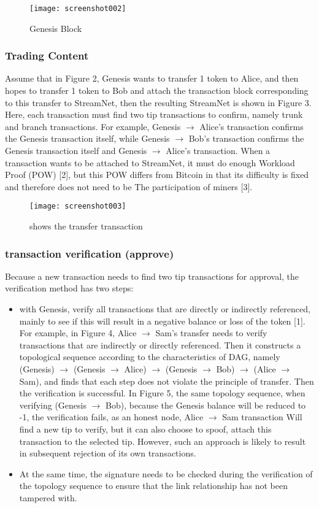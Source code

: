 \documentclass{article}
\begin{document}
\begin{figure}[H]
	\centering
	\texttt{[image: screenshot002]}
	\caption{Genesis Block}
	\label{simulationfigure}
\end{figure}

\subsubsection{Trading Content}
Assume that in Figure 2, Genesis wants to transfer 1 token to Alice, and then hopes to transfer 1 token to Bob and attach the transaction block corresponding to this transfer to StreamNet, then the resulting StreamNet is shown in Figure 3. Here, each transaction must find two tip transactions to confirm, namely trunk and branch transactions. For example, Genesis $\rightarrow$ Alice's transaction confirms the Genesis transaction itself, while Genesis $\rightarrow$ Bob's transaction confirms the Genesis transaction itself and Genesis $\rightarrow$ Alice's transaction. When a transaction wants to be attached to StreamNet, it must do enough Workload Proof (POW) [2], but this POW differs from Bitcoin in that its difficulty is fixed and therefore does not need to be The participation of miners [3].

\begin{figure}[H]
	\centering
	\texttt{[image: screenshot003]}
	\caption{shows the transfer transaction}
	\label{simulationfigure}
\end{figure}

\subsubsection{transaction verification (approve)}
Because a new transaction needs to find two tip transactions for approval, the verification method has two steps:
\begin{itemize}
\item with Genesis, verify all transactions that are directly or indirectly referenced, mainly to see if this will result in a negative balance or loss of the token [1]. For example, in Figure 4, Alice $\rightarrow$ Sam's transfer needs to verify transactions that are indirectly or directly referenced. Then it constructs a topological sequence according to the characteristics of DAG, namely (Genesis) $\rightarrow$ (Genesis $\rightarrow$ Alice) $\rightarrow$ (Genesis $\rightarrow$ Bob) $\rightarrow$ (Alice $\rightarrow$ Sam), and finds that each step does not violate the principle of transfer. Then the verification is successful. In Figure 5, the same topology sequence, when verifying (Genesis $\rightarrow$ Bob), because the Genesis balance will be reduced to -1, the verification fails, as an honest node, Alice $\rightarrow$ Sam transaction Will find a new tip to verify, but it can also choose to spoof, attach this transaction to the selected tip. However, such an approach is likely to result in subsequent rejection of its own transactions.
\item At the same time, the signature needs to be checked during the verification of the topology sequence to ensure that the link relationship has not been tampered with.
\end{itemize}
\end{document}
